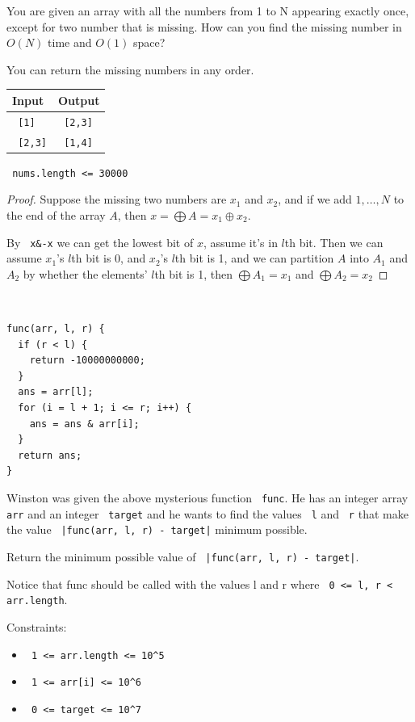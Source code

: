 \documentclass[11pt]{article}
\let\OldTexttt\texttt
\renewcommand{\texttt}[1]{\OldTexttt{\color{MidnightBlue} #1}}
\begin{document}
\begin{problem}
You are given an array with all the numbers from 1 to N appearing exactly once, except for two
number that is missing. How can you find the missing number in \(O(N)\) time and \(O(1)\) space?

You can return the missing numbers in any order.

\begin{center}
\begin{tabular}{ll}
Input & Output\\
\hline
\texttt{[1]} & \texttt{[2,3]}\\
\texttt{[2,3]} & \texttt{[1,4]}\\
\end{tabular}
\end{center}


\texttt{nums.length <= 30000}
\end{problem}

\begin{proof}
Suppose the missing two numbers are \(x_1\) and \(x_2\), and if we add \(1,\dots,N\) to the end of the
array \(A\), then \(x=\bigoplus A=x_1\oplus x_2\).

By \texttt{x\&-x} we can get the lowest bit of \(x\), assume it's in \(l\)th bit. Then we can
assume \(x_1\)'s \(l\)th bit is 0, and \(x_2\)'s \(l\)th bit is 1, and we can partition \(A\) into
\(A_1\) and \(A_2\) by whether the elements' \(l\)th bit is 1, then \(\bigoplus A_1=x_1\) and \(\bigoplus A_2=x_2\)
\end{proof}

\begin{problem}
​
\begin{verbatim}
func(arr, l, r) {
  if (r < l) {
    return -10000000000;
  }
  ans = arr[l];
  for (i = l + 1; i <= r; i++) {
    ans = ans & arr[i];
  }
  return ans;
}
\end{verbatim}
Winston was given the above mysterious function \texttt{func}. He has an integer array \texttt{arr} and an integer
\texttt{target} and he wants to find the values \texttt{l} and \texttt{r} that make the value \texttt{|func(arr, l, r) - target|}
minimum possible.

Return the minimum possible value of \texttt{|func(arr, l, r) - target|}.

Notice that func should be called with the values l and r where \texttt{0 <= l, r < arr.length}.

Constraints:
\begin{itemize}
\item \texttt{1 <= arr.length <= 10\textasciicircum{}5}
\item \texttt{1 <= arr[i] <= 10\textasciicircum{}6}
\item \texttt{0 <= target <= 10\textasciicircum{}7}
\end{itemize}
\end{problem}
\end{document}
